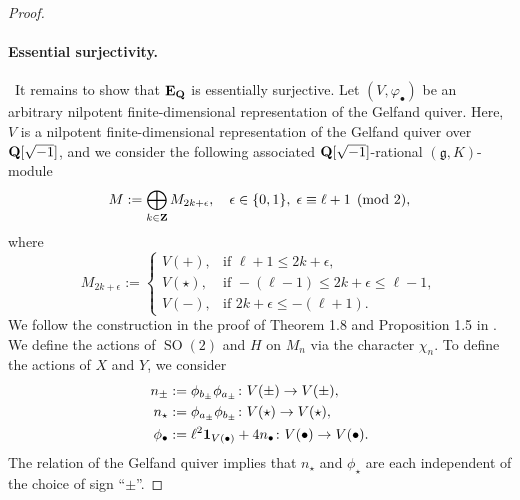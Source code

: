 \documentclass[a4paper,12pt,reqno]{amsart}
\newcommand{\QQ}{{\rm\bf Q}}
\newcommand{\ZZ}{{\rm\bf Z}}
\newcommand{\EE}{{\rm\bf E}}
\DeclareMathOperator{\SO}{\mathrm{SO}}
\theoremstyle{plain}
\theoremstyle{remark}
\begin{document}
\begin{proof}
    \paragraph{Essential surjectivity.}\ 
    It remains to show that $\EE_\QQ$ is essentially surjective. Let $(V,\varphi_\bullet)$ be an arbitrary nilpotent finite-dimensional representation of the Gelfand quiver. Here, $V$ is a nilpotent finite-dimensional representation of the Gelfand quiver over $\QQ[\sqrt{-1}]$, and we consider the following associated $\QQ[\sqrt{-1}]$-rational $(\mathfrak{g}, K)$-module
    \[
    M:=\bigoplus_{k\in\ZZ} M_{2k+\epsilon},\quad \epsilon\in\{0,1\},\;\epsilon\equiv\ell+1\pmod{2},
    \]
    where
    \[
    M_{2k+\epsilon}:=
    \begin{cases}
      V(+), & \text{if }\ell+1\leq 2k+\epsilon,\\
      V(\star), & \text{if } -(\ell-1)\leq 2k+\epsilon\leq\ell-1,\\
      V(-), & \text{if } 2k+\epsilon\leq -(\ell+1).
    \end{cases}
    \]
    We follow the construction in the proof of Theorem 1.8 and Proposition 1.5 in \cite{ABR}. We define the actions of $\SO(2)$ and $H$ on $M_n$ via the character $\chi_n$. To define the actions of $X$ and $Y$, we consider
    \begin{align*}
    n_{\pm}&:=\phi_{b_\pm}\phi_{a_\pm}\colon V(\pm)\to V(\pm),\\
    n_{\star}&:=\phi_{a_\pm}\phi_{b_\pm}\colon V(\star)\to V(\star),\\
    \phi_{\bullet}&:=\ell^2{\bf1}_{V(\bullet)}+4n_{\bullet}\colon V(\bullet)\to V(\bullet).
    \end{align*}
    The relation of the Gelfand quiver implies that $n_{\star}$ and $\phi_{\star}$ are each independent of the choice of sign ``$\pm$''.


\end{proof}
\end{document}
